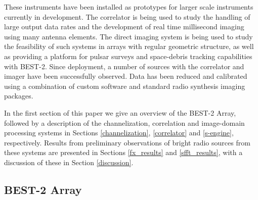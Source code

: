 \documentclass[useAMS,macros,usenatbib,onecolumn]{mn2e}
\begin{document}
These instruments have been installed as prototypes for larger scale instruments currently in development.
The correlator is being used to study the handling of large output data rates and the development of real time millisecond imaging using many antenna elements.
The direct imaging system is being used to study the feasibility of such systems in arrays with regular geometric structure, as well as providing a platform for pulsar surveys and space-debris tracking capabilities with BEST-2.
Since deployment, a number of sources with the correlator and imager have been successfully observed.
Data has been reduced and calibrated using a combination of custom software and standard radio synthesis imaging packages.

In the first section of this paper we give an overview of the BEST-2 Array, followed by a description of the channelization, correlation and image-domain processing systems in Sections \ref{channelization}, \ref{correlator} and \ref{s-engine}, respectively.
Results from preliminary observations of bright radio sources from these systems are presented in Sections \ref{fx_results} and \ref{sfft_results}, with a discussion of these in Section \ref{discussion}.

\subsection{BEST-2 Array}
\label{best-2 array}
\end{document}
